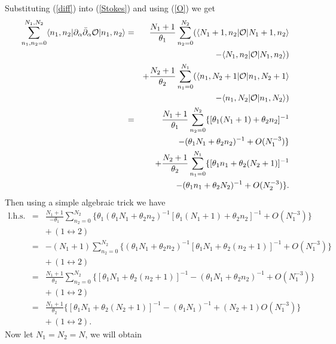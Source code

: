 \documentclass[a4paper,a4paper]{article}
\begin{document}
Substituting (\ref{diff}) into (\ref{Stokes}) and using (\ref{O}) we get%
\begin{eqnarray}
\sum_{n_{1},n_{2}=0}^{N_{1},N_{2}}\langle n_{1},n_{2}|\partial _{\alpha }%
\bar{\partial}_{\alpha }\mathcal{O}|n_{1},n_{2}\rangle &=&\frac{N_{1}+1}{%
\theta _{1}}\sum_{n_{2}=0}^{N_{2}}(\langle N_{1}+1,n_{2}|\mathcal{O}%
|N_{1}+1,n_{2}\rangle  \nonumber \\
&&-\langle N_{1},n_{2}|\mathcal{O}|N_{1},n_{2}\rangle )  \nonumber \\
&&+\frac{N_{2}+1}{\theta _{2}}\sum_{n_{1}=0}^{N_{1}}(\langle n_{1},N_{2}+1|%
\mathcal{O}|n_{1},N_{2}+1\rangle  \nonumber \\
&&-\langle n_{1},N_{2}|\mathcal{O}|n_{1},N_{2}\rangle )  \nonumber \\
&=&\frac{N_{1}+1}{\theta _{1}}\sum_{n_{2}=0}^{N_{2}}\{[\theta
_{1}(N_{1}+1)+\theta _{2}n_{2}]^{-1}  \nonumber \\
&&-(\theta _{1}N_{1}+\theta _{2}n_{2})^{-1}+O(N_{1}^{-3})\}  \nonumber \\
&&+\frac{N_{2}+1}{\theta _{2}}\sum_{n_{1}=0}^{N_{1}}\{[\theta
_{1}n_{1}+\theta _{2}(N_{2}+1)]^{-1}  \nonumber \\
&&-(\theta _{1}n_{1}+\theta _{2}N_{2})^{-1}+O(N_{2}^{-3})\}.
\end{eqnarray}%
Then using a simple algebraic trick we have%
\begin{eqnarray}
\textrm{l.h.s.} &=&\frac{N_{1}+1}{-\theta
_{1}}\sum_{n_{2}=0}^{N_{2}}\{\theta _{1}(\theta _{1}N_{1}+\theta
_{2}n_{2})^{-1}[\theta _{1}(N_{1}+1)+\theta
_{2}n_{2}]^{-1}+O(N_{1}^{-3})\}  \nonumber \\
&&+\,(1\leftrightarrow 2)  \nonumber \\
&=&-(N_{1}+1)\sum_{n_{2}=0}^{N_{2}}\{(\theta _{1}N_{1}+\theta
_{2}n_{2})^{-1}[\theta _{1}N_{1}+\theta
_{2}(n_{2}+1)]^{-1}+O(N_{1}^{-3})\}
\nonumber \\
&&+\,(1\leftrightarrow 2)  \nonumber \\
&=&\frac{N_{1}+1}{\theta _{2}}\sum_{n_{2}=0}^{N_{2}}\{[\theta
_{1}N_{1}+\theta _{2}(n_{2}+1)]^{-1}-(\theta _{1}N_{1}+\theta
_{2}n_{2})^{-1}+O(N_{1}^{-3})\}  \nonumber \\
&&+\,(1\leftrightarrow 2)  \nonumber \\
&=&\frac{N_{1}+1}{\theta _{2}}\{[\theta _{1}N_{1}+\theta
_{2}(N_{2}+1)]^{-1}-(\theta
_{1}N_{1})^{-1}+(N_{2}+1)O(N_{1}^{-3})\}
\nonumber \\
&&+\,(1\leftrightarrow 2).
\end{eqnarray}%
Now let $N_{1}=N_{2}=N$, we will obtain%
\end{document}
